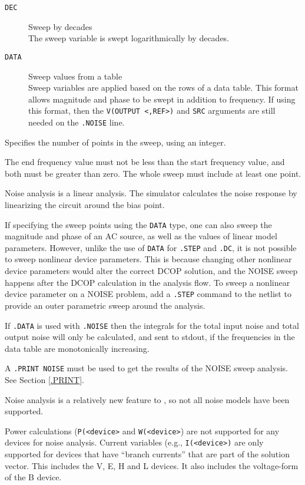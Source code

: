 \begin{Command}
\begin{Arguments}
\begin{description}
\item[\tt DEC] Sweep by decades\\
The sweep variable is swept logarithmically by decades.

\item[\tt DATA] Sweep values from a table\\
Sweep variables are applied based on the rows of a data table.  This format
allows magnitude and phase to be swept in addition to frequency.  If using
this format, then the \texttt{V(OUTPUT <,REF>)} and \texttt{SRC} arguments
are still needed on the \texttt{.NOISE} line.

\end{description}

Specifies the number of points in the sweep, using an integer.


The end frequency value must not be less than the start frequency value,
and both must be greater than zero. The whole sweep must include at
least one point.

\end{Arguments}

\comments

Noise analysis is a linear analysis. The simulator calculates the noise
response by linearizing the circuit around the bias point.

If specifying the sweep points using the \texttt{DATA} type, one can also
sweep the magnitude and phase of an AC source, as well as the values of
linear model parameters.  However, unlike the use of \texttt{DATA} for
\texttt{.STEP} and \texttt{.DC}, it is not possible to sweep nonlinear device
parameters.  This is because changing other nonlinear device parameters would
alter the correct DCOP solution, and the NOISE sweep happens after the DCOP
calculation in the analysis flow.  To sweep a nonlinear device parameter on
a NOISE problem, add a \texttt{.STEP} command to the netlist to provide an
outer parametric sweep around the analysis.

If \texttt{.DATA} is used with \texttt{.NOISE} then the integrals for the total
input noise and total output noise will only be calculated, and sent to stdout,
if the frequencies in the data table are monotonically increasing.

A \texttt{.PRINT NOISE} must be used to get the results of the NOISE sweep
analysis.  See Section \ref{.PRINT}.

Noise analysis is a relatively new feature to \Xyce{}, so not all noise models
have been supported.

Power calculations (\texttt{P(<device>} and \texttt{W(<device>}) are not supported for any
devices for noise analysis.  Current variables (e.g., \texttt{I(<device>)} are only supported
for devices that have ``branch currents'' that are part of the solution vector. This includes
the V, E, H and L devices.  It also includes the voltage-form of the B device.

\end{Command}
